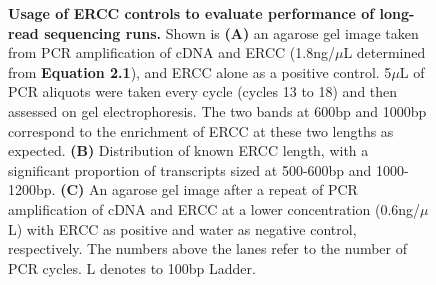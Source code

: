 \begin{figure}[!htp]
\begin{center}
	\end{center}
	\captionsetup{width=0.95\textwidth}
	\caption[Usage of ERCC controls to evaluate performance of long-read sequencing runs]%
	{\textbf{Usage of ERCC controls to evaluate performance of long-read sequencing runs.} Shown is \textbf{(A)} an agarose gel image taken from PCR amplification of cDNA and ERCC (1.8ng/$\mu$L determined from \textbf{Equation 2.1}), and ERCC alone as a positive control. 5$\mu$L of PCR aliquots were taken every cycle (cycles 13 to 18) and then assessed on gel electrophoresis. The two bands at 600bp and 1000bp correspond to the enrichment of ERCC at these two lengths as expected. \textbf{(B)} Distribution of known ERCC length, with a significant proportion of transcripts sized at 500-600bp and 1000-1200bp. \textbf{(C)} An agarose gel image after a repeat of PCR amplification of cDNA and ERCC at a lower concentration (0.6ng/$\mu$L) with ERCC as positive and water as negative control, respectively. The numbers above the lanes refer to the number of PCR cycles. L denotes to 100bp Ladder.}
	\label{fig:ercc_lab_gel}
\end{figure}
 
